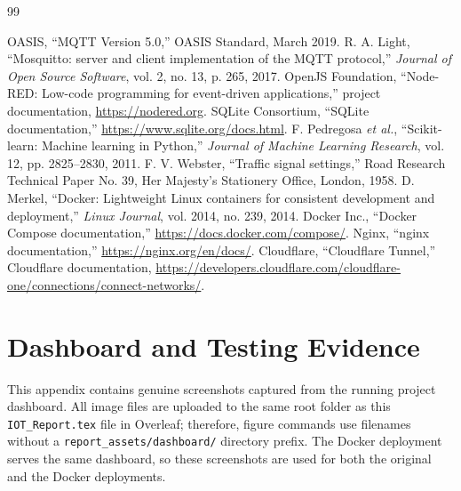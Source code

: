 \documentclass[12pt,a4paper,oneside]{report}
\begin{document}
\clearpage
\renewcommand{\bibname}{References}
\begin{thebibliography}{99}
\setlength{\itemsep}{6pt}
\setlength{\parskip}{0pt}
 OASIS, ``MQTT Version 5.0,'' OASIS Standard, March 2019.
 R. A. Light, ``Mosquitto: server and client implementation of the MQTT protocol,'' \textit{Journal of Open Source Software}, vol. 2, no. 13, p. 265, 2017.
 OpenJS Foundation, ``Node-RED: Low-code programming for event-driven applications,'' project documentation, \url{https://nodered.org}.
 SQLite Consortium, ``SQLite documentation,'' \url{https://www.sqlite.org/docs.html}.
 F. Pedregosa \textit{et al.}, ``Scikit-learn: Machine learning in Python,'' \textit{Journal of Machine Learning Research}, vol. 12, pp. 2825--2830, 2011.
 F. V. Webster, ``Traffic signal settings,'' Road Research Technical Paper No. 39, Her Majesty's Stationery Office, London, 1958.
 D. Merkel, ``Docker: Lightweight Linux containers for consistent development and deployment,'' \textit{Linux Journal}, vol. 2014, no. 239, 2014.
 Docker Inc., ``Docker Compose documentation,'' \url{https://docs.docker.com/compose/}.
 Nginx, ``nginx documentation,'' \url{https://nginx.org/en/docs/}.
 Cloudflare, ``Cloudflare Tunnel,'' Cloudflare documentation, \url{https://developers.cloudflare.com/cloudflare-one/connections/connect-networks/}.
\end{thebibliography}

\clearpage\appendix
\chapter{Dashboard and Testing Evidence}
This appendix contains genuine screenshots captured from the running project dashboard. All image files are uploaded to the same root folder as this \texttt{IOT\_Report.tex} file in Overleaf; therefore, figure commands use filenames without a \texttt{report\_assets/dashboard/} directory prefix. The Docker deployment serves the same dashboard, so these screenshots are used for both the original and the Docker deployments.
\end{document}
